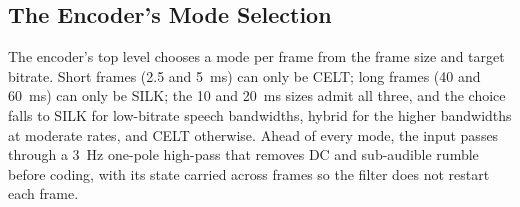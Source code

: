 \subsection{The Encoder's Mode Selection}\label{subsec:encode_auto}

The encoder's top level chooses a mode per frame from the frame size and target
bitrate. Short frames (2.5 and 5~ms) can only be CELT; long frames (40 and
60~ms) can only be SILK; the 10 and 20~ms sizes admit all three, and the choice
falls to SILK for low-bitrate speech bandwidths, hybrid for the higher bandwidths
at moderate rates, and CELT otherwise. Ahead of every mode, the input passes
through a 3~Hz one-pole high-pass that removes DC and sub-audible rumble before
coding, with its state carried across frames so the filter does not restart each
frame.

